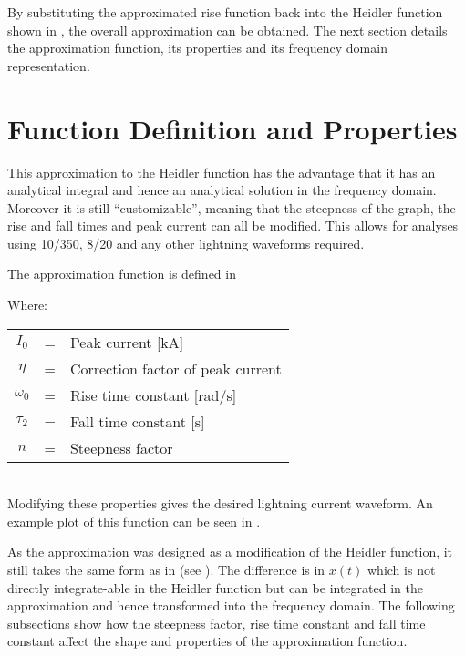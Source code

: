By substituting the approximated rise function back into the Heidler function shown in , the overall approximation can be obtained. The next section details the approximation function, its properties and its frequency domain representation.


\section{Function Definition and Properties}
\label{sec:approx_function_definition_and_properties}

This approximation to the Heidler function has the advantage that it has an analytical integral and hence an analytical solution in the frequency domain. Moreover it is still ``customizable'', meaning that the steepness of the graph, the rise and fall times and peak current can all be modified. This allows for analyses using 10/350, 8/20 and any other lightning waveforms required.

The approximation function is defined in 

Where: \\
\begin{tabular}{cll}
    $I_0$ & = & Peak current [kA] \\
    $\eta$ & = & Correction factor of peak current \\
    $\omega_0$ & = & Rise time constant [rad/s] \\
    $\tau_2$ & = & Fall time constant [s] \\
    $n$ & = & Steepness factor
\end{tabular}\\

Modifying these properties gives the desired lightning current waveform. An example plot of this function can be seen in .

As the approximation was designed as a modification of the Heidler function, it still takes the same form as in  (see ). The difference is in $x \left( t \right)$ which is not directly integrate-able in the Heidler function but can be integrated in the approximation and hence transformed into the frequency domain. The following subsections show how the steepness factor, rise time constant and fall time constant affect the shape and properties of the approximation function.

